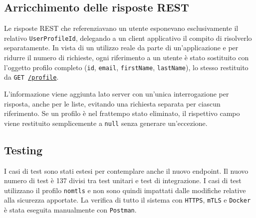 \subsection{Arricchimento delle risposte REST}
Le risposte REST che referenziavano un utente esponevano esclusivamente il relativo \texttt{UserProfileId}, delegando a un client applicativo il compito di risolverlo separatamente. In vista di un utilizzo reale da parte di un'applicazione e per ridurre il numero di richieste, ogni riferimento a un utente è stato sostituito con l'oggetto profilo completo (\texttt{id}, \texttt{email}, \texttt{firstName}, \texttt{lastName}), lo stesso restituito da \texttt{GET \url{/profile}}.

L'informazione viene aggiunta lato server con un'unica interrogazione per risposta, anche per le liste, evitando una richiesta separata per ciascun riferimento. Se un profilo è nel frattempo stato eliminato, il rispettivo campo viene restituito semplicemente a \texttt{null} senza generare un'eccezione.

\subsection{Testing}
I casi di test sono stati estesi per contemplare anche il nuovo endpoint. Il nuovo numero di test è 137 divisi tra test unitari e test di integrazione. I casi di test utilizzano il profilo \texttt{nomtls} e non sono quindi impattati dalle modifiche relative alla sicurezza apportate. La verifica di tutto il sistema con \texttt{HTTPS}, \texttt{mTLS} e \texttt{Docker} è stata eseguita manualmente con \texttt{Postman}.
